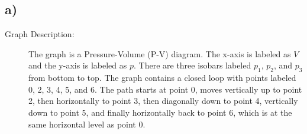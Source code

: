 

\subsection*{a)}

\begin{description}
    \item[Graph Description:] The graph is a Pressure-Volume (P-V) diagram. The x-axis is labeled as \( V \) and the y-axis is labeled as \( p \). There are three isobars labeled \( p_1 \), \( p_2 \), and \( p_3 \) from bottom to top. The graph contains a closed loop with points labeled 0, 2, 3, 4, 5, and 6. The path starts at point 0, moves vertically up to point 2, then horizontally to point 3, then diagonally down to point 4, vertically down to point 5, and finally horizontally back to point 6, which is at the same horizontal level as point 0.
\end{description}